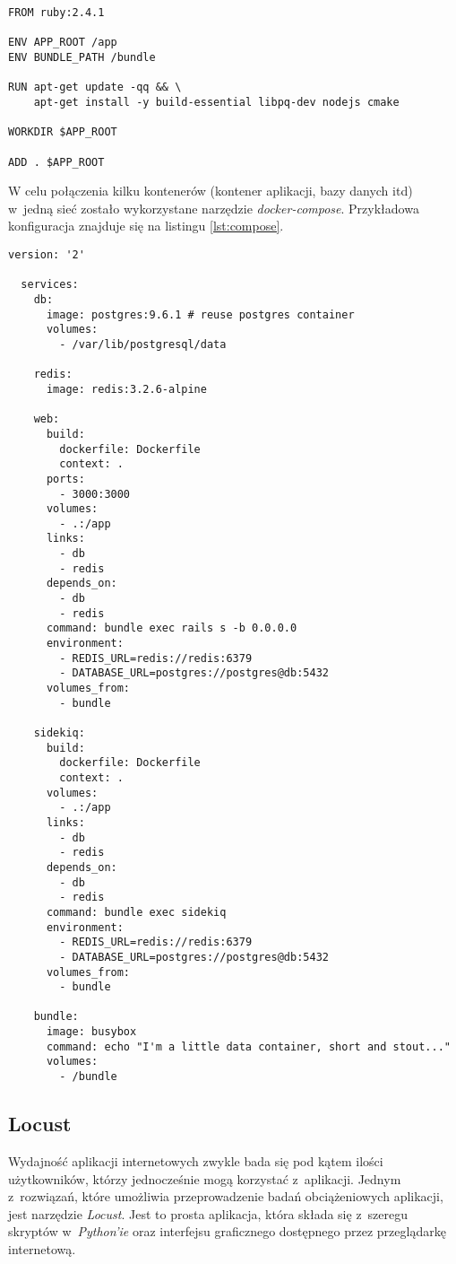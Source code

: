 \begin{lstlisting}[caption={Przykładowy plik Dockerfile.}]
FROM ruby:2.4.1

ENV APP_ROOT /app
ENV BUNDLE_PATH /bundle

RUN apt-get update -qq && \
    apt-get install -y build-essential libpq-dev nodejs cmake

WORKDIR $APP_ROOT

ADD . $APP_ROOT
\end{lstlisting}

W celu połączenia kilku kontenerów (kontener aplikacji, bazy danych itd) w~jedną sieć zostało wykorzystane narzędzie \emph{docker-compose}. Przykładowa konfiguracja znajduje się na listingu \ref{lst:compose}.

\begin{lstlisting}[caption={Przykładowy plik docker-compose.yml.},label={lst:compose}]
  version: '2'

  services:
    db:
      image: postgres:9.6.1 # reuse postgres container
      volumes:
        - /var/lib/postgresql/data

    redis:
      image: redis:3.2.6-alpine

    web:
      build:
        dockerfile: Dockerfile
        context: .
      ports:
        - 3000:3000
      volumes:
        - .:/app
      links:
        - db
        - redis
      depends_on:
        - db
        - redis
      command: bundle exec rails s -b 0.0.0.0
      environment:
        - REDIS_URL=redis://redis:6379
        - DATABASE_URL=postgres://postgres@db:5432
      volumes_from:
        - bundle

    sidekiq:
      build:
        dockerfile: Dockerfile
        context: .
      volumes:
        - .:/app
      links:
        - db
        - redis
      depends_on:
        - db
        - redis
      command: bundle exec sidekiq
      environment:
        - REDIS_URL=redis://redis:6379
        - DATABASE_URL=postgres://postgres@db:5432
      volumes_from:
        - bundle

    bundle:
      image: busybox
      command: echo "I'm a little data container, short and stout..."
      volumes:
        - /bundle
\end{lstlisting}

\subsection{Locust}
Wydajność aplikacji internetowych zwykle bada się pod kątem ilości użytkowników, którzy jednocześnie mogą korzystać z~aplikacji. Jednym z~rozwiązań, które umożliwia przeprowadzenie badań obciążeniowych aplikacji, jest narzędzie \emph{Locust}. Jest to prosta aplikacja, która składa się z~szeregu skryptów w~\emph{Python'ie} oraz interfejsu graficznego dostępnego przez przeglądarkę internetową.

